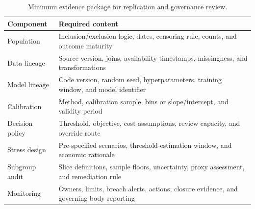 \documentclass[10pt]{article}
\begin{document}
\begin{table}[!ht]
\centering
\caption{Minimum evidence package for replication and governance review.}
\label{tab:audit_package}
\begin{tabular}{L{3.5cm}L{10.5cm}}
\toprule
Component & Required content \\
\midrule
Population & Inclusion/exclusion logic, dates, censoring rule, counts, and outcome maturity \\
Data lineage & Source version, joins, availability timestamps, missingness, and transformations \\
Model lineage & Code version, random seed, hyperparameters, training window, and model identifier \\
Calibration & Method, calibration sample, bins or slope/intercept, and validity period \\
Decision policy & Threshold, objective, cost assumptions, review capacity, and override route \\
Stress design & Pre-specified scenarios, threshold-estimation window, and economic rationale \\
Subgroup audit & Slice definitions, sample floors, uncertainty, proxy assessment, and remediation rule \\
Monitoring & Owners, limits, breach alerts, actions, closure evidence, and governing-body reporting \\
\bottomrule
\end{tabular}
\end{table}
\end{document}
